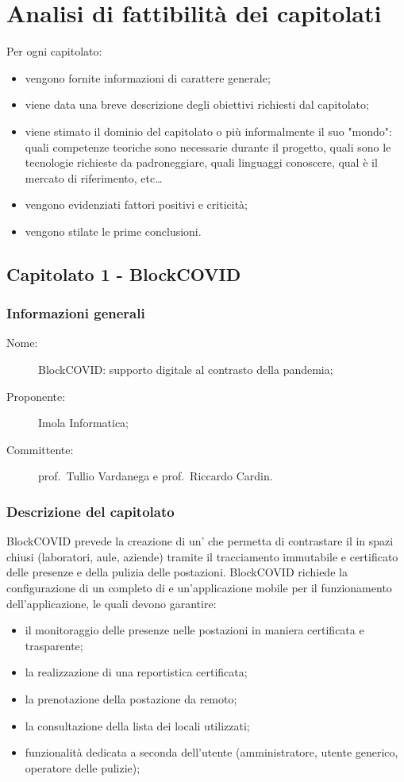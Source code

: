 \section{Analisi di fattibilità dei capitolati}
Per ogni capitolato:
\begin{itemize}
	\item vengono fornite informazioni di carattere generale;
	\item viene data una breve descrizione degli obiettivi richiesti dal capitolato;
	\item viene stimato il dominio del capitolato o più informalmente il suo "mondo": quali competenze teoriche sono necessarie durante il progetto, quali sono le tecnologie richieste da padroneggiare, quali linguaggi conoscere, qual è il mercato di riferimento, etc\dots 
	\item vengono evidenziati fattori positivi e criticità;
	\item vengono stilate le prime conclusioni.
\end{itemize}

\subsection{Capitolato 1 - BlockCOVID}
\subsubsection{Informazioni generali}
\begin{description}
	\item[Nome:] BlockCOVID: supporto digitale al contrasto della pandemia;
	\item[Proponente:] Imola Informatica;
	\item[Committente:] prof.~Tullio Vardanega e prof.~Riccardo Cardin.
\end{description}
\subsubsection{Descrizione del capitolato}
BlockCOVID prevede la creazione di un' che permetta di contrastare il  in spazi chiusi (laboratori, aule, aziende) tramite il tracciamento immutabile e certificato delle presenze e della pulizia delle postazioni.
BlockCOVID richiede la configurazione di un   completo di  e un'applicazione mobile per il funzionamento dell'applicazione, le quali devono garantire:
\begin{itemize}
\item il monitoraggio delle presenze nelle postazioni in maniera certificata e trasparente;
\item la realizzazione di una reportistica certificata;
\item la prenotazione della postazione da remoto;
\item la consultazione della lista dei locali utilizzati;
\item funzionalità dedicata a seconda dell'utente (amministratore, utente generico, operatore delle pulizie);
\end{itemize}
